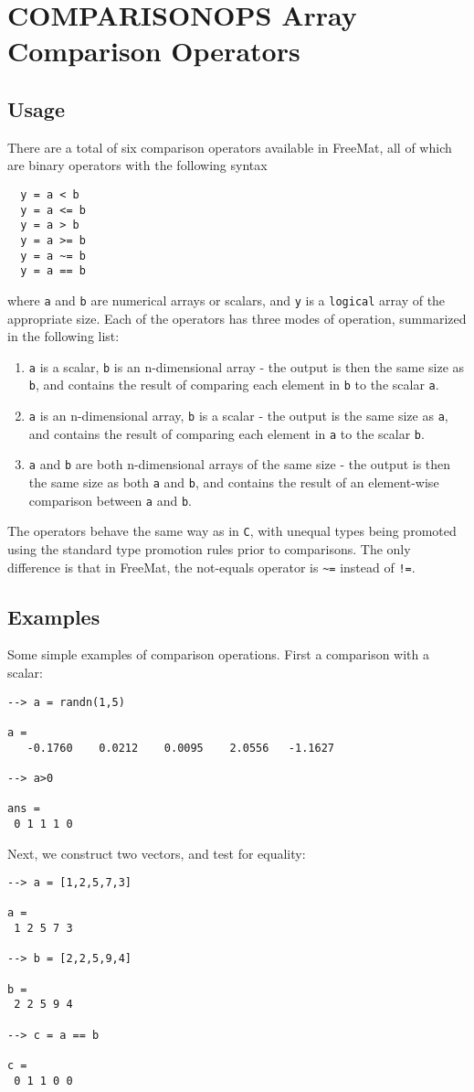 \section{COMPARISONOPS Array Comparison Operators}

\subsection{Usage}

There are a total of six comparison operators available in FreeMat, all of which are binary operators with the following syntax
\begin{verbatim}
  y = a < b
  y = a <= b
  y = a > b
  y = a >= b
  y = a ~= b
  y = a == b
\end{verbatim}
where \verb|a| and \verb|b| are numerical arrays or scalars, and \verb|y| is a \verb|logical| array of the appropriate size.  Each of the operators has three modes of operation, summarized in the following list:
\begin{enumerate}
\item  \verb|a| is a scalar, \verb|b| is an n-dimensional array - the output is then the same size as \verb|b|, and contains the result of comparing each element in \verb|b| to the scalar \verb|a|.

\item  \verb|a| is an n-dimensional array, \verb|b| is a scalar - the output is the same size as \verb|a|, and contains the result of comparing each element in \verb|a| to the scalar \verb|b|.

\item  \verb|a| and \verb|b| are both n-dimensional arrays of the same size - the output is then the same size as both \verb|a| and \verb|b|, and contains the result of an element-wise comparison between \verb|a| and \verb|b|.

\end{enumerate}
The operators behave the same way as in \verb|C|, with unequal types being promoted using the standard type promotion rules prior to comparisons.  The only difference is that in FreeMat, the not-equals operator is \verb|~=| instead of \verb|!=|.
\subsection{Examples}

Some simple examples of comparison operations.  First a comparison with a scalar:
\begin{verbatim}
--> a = randn(1,5)

a = 
   -0.1760    0.0212    0.0095    2.0556   -1.1627 

--> a>0

ans = 
 0 1 1 1 0 
\end{verbatim}
Next, we construct two vectors, and test for equality:
\begin{verbatim}
--> a = [1,2,5,7,3]

a = 
 1 2 5 7 3 

--> b = [2,2,5,9,4]

b = 
 2 2 5 9 4 

--> c = a == b

c = 
 0 1 1 0 0 
\end{verbatim}
